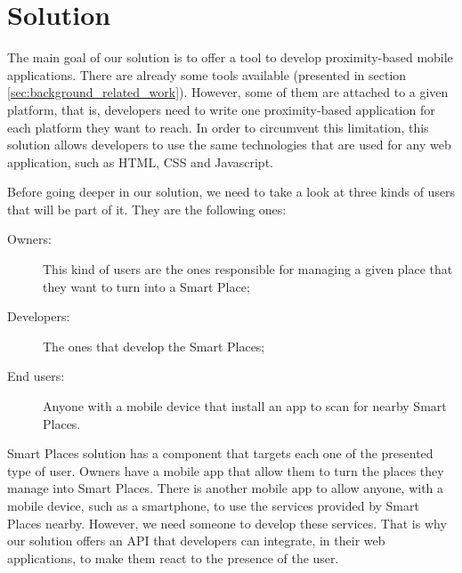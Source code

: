 
\chapter{Solution}
\label{chapter:solution}
The main goal of our solution is to offer a tool
to develop proximity-based mobile applications.
There are already some tools available (presented in section \ref{sec:background_related_work}).
However, some of them are attached to a given platform, that is, developers
need to write one proximity-based application for each platform they want
to reach.
In order to circumvent this limitation, this solution allows developers
to use the same technologies that are used for any web application, such as \gls{HTML}, \gls{CSS} and Javascript.

Before going deeper in our solution, we need to take a look at three kinds of users that will be part of it.
They are the following ones:
\begin{description}
  \item[Owners:] This kind of users are the ones responsible for managing a given place that they want to turn into a Smart Place;
  \item[Developers:] The ones that develop the Smart Places;
  \item[End users:] Anyone with a mobile device that install an app to scan for nearby Smart Places.
\end{description}

Smart Places solution has a component that targets each one of the presented type of user.
Owners have a mobile app that allow them to turn the places they manage into Smart Places.
There is another mobile app to allow anyone, with a mobile device, such as a smartphone, to use the services provided by Smart Places nearby.
However, we need someone to develop these services.
That is why our solution offers an \gls{API} that developers can integrate, in their web applications, to make them react to the presence of the user.

